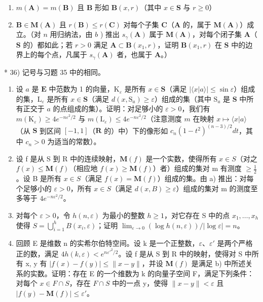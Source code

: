 \begin{enumerate}
\def\labelenumi{(\roman{enumi})}
\item
  \(m(\mathbf{A}) = m(\mathbf{B})\) 且 \(\mathbf{B}\) 形如 \(\mathbf{B}(x,r)\)（其中 \(x\in \mathbf{S}\) 与 \(r\geqslant 0\)）
\item
  \(\mathbf{B} \in \mathbf{M}(\mathbf{A})\) 且 \(r(\mathbf{B}) \leqslant r(\mathbf{C})\) 对每个子集 \(\mathbf{C}\)（\(\mathbf{A}\) 的，属于 \(\mathbf{M}(\mathbf{A})\)）成立。（对 \(n\) 用归纳法，由 \(b\) ) 推出 \(s_{\gamma}(\mathbf{A})\) 属于 \(\mathbf{M}(\mathbf{A})\)，对每个闭子集 \(\mathbf{A}\)（\(\mathbf{S}\) 的）都如此；若 \(r > 0\) 满足 \(\mathbf{A} \subset \mathbf{B}(x_1, r)\)，证明 \(\mathbf{B}(x_1, r)\) 在 \(\mathbf{S}\) 中的边界上的每个点，凡属于 \(s_{\gamma}(\mathbf{A})\) 者，也属于 \(\mathbf{A}\)。）
\end{enumerate}

* 36) 记号与习题 35 中的相同。

\begin{enumerate}
\def\labelenumi{\alph{enumi})}
\item
  设 \(a\) 是 \(\mathbf{E}\) 中范数为 1 的向量，\(\mathrm{K}_{\varepsilon}\) 是所有 \(x \in \mathbf{S}\)（满足 \(|\langle x|a\rangle| \leqslant \sin \varepsilon\)）组成的集，\(\mathrm{L}_{\varepsilon}\) 是所有 \(x \in \mathbf{S}\)（满足 \(d(x, \mathrm{S}_a) \geqslant \varepsilon\)）组成的集（其中 \(\mathrm{S}_a\) 是 \(\mathbf{S}\) 中所有正交于 \(a\) 的点组成的集）。证明：对足够小的 \(\varepsilon > 0\)，我们有 \(m(\mathrm{K}_{\varepsilon}) \geqslant 4e^{-n\varepsilon^2 / 2}\) 与 \(m(\mathrm{L}_{\varepsilon}) \leqslant 4e^{-n\varepsilon^2 / 2}\)（注意测度 \(m\) 在映射 \(x \mapsto \langle x|a\rangle\)（从 \(\mathbf{S}\) 到区间 \([-1, 1]\)（\(\mathbf{R}\) 的）中）下的像形如 \(c_n(1 - t^2)^{(n-3)/2}dt\)，其中 \(c_n > 0\) 为适当的常数）。
\item
  设 f 是从 S 到 R 中的连续映射，\(\mathbf{M}(f)\) 是一个实数，使得所有 \(x \in S\)（对之 \(f(x) \leqslant \mathbf{M}(f)\)（相应地 \(f(x) \geqslant \mathbf{M}(f)\)）者）组成的集对 m 有测度 \(\geqslant \frac{1}{2}\)。设 B 是所有 \(x \in S\)（满足 \(f(x) = \mathbf{M}(f)\)）组成的集。由 a) 推出：对每个足够小的 \(\varepsilon > 0\)，所有 \(x \in S\)（满足 \(d(x, B) \geqslant \varepsilon\)）组成的集对 m 的测度至多等于 \(4e^{-n\varepsilon^{2}/2}\)。
\item
  对每个 \(\varepsilon > 0\)，令 \(h(n, \varepsilon)\) 为最小的整数 \(h \geqslant 1\)，对它存在 S 中的点 \(x_1, \ldots, x_h\) 使得 \(S = \bigcup_{i=1}^{h} B(x_i, \varepsilon)\)；证明 \(\lim_{\varepsilon \to 0} (\log h(n, \varepsilon)) / |\log \varepsilon| = n\)。
\item
  回顾 E 是维数 n 的实希尔伯特空间。设 k 是一个正整数，\(\varepsilon\)、\(\varepsilon'\) 是两个严格正的数，满足 \(4h(k, \varepsilon) < e^{n\varepsilon'^{2}/2}\)。设 f 是从 S 到 R 中的映射，使得对 S 中所有 x, y 有 \(|f(x) - f(y)| \leqslant \|x - y\|\)，并设 \(\mathbf{M}(f)\) 是满足 b) 中所述关系的实数。证明：存在 E 的一个维数为 k 的向量子空间 F，满足下列条件：对每个 \(x \in F \cap S\)，存在 \(F \cap S\) 中的一点 y，使得 \(\|x - y\| < \varepsilon\) 且 \(|f(y) - \mathbf{M}(f)| \leqslant \varepsilon'\)。
\end{enumerate}


